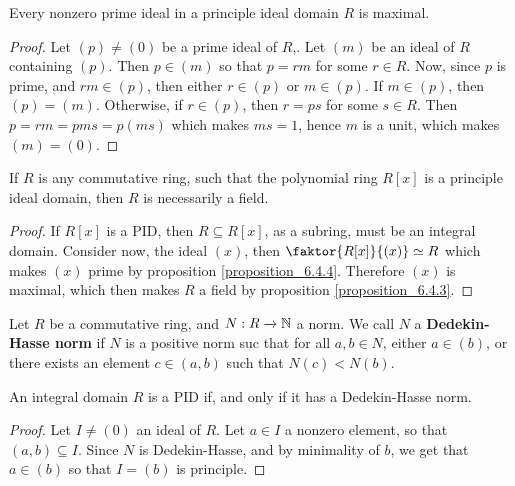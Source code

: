 \begin{proposition}\label{proposition_6.6.2}
  Every nonzero prime ideal in a principle ideal domain $R$ is maximal.
\end{proposition}
\begin{proof}
  Let $(p) \neq (0)$ be a prime ideal of $R$,. Let $(m)$ be an ideal of $R$
  containing $(p)$. Then $p \in (m)$ so that $p=rm$ for some  $r \in R$. Now,
  since $p$ is prime, and $rm \in (p)$, then either $r \in (p)$ or $m \in
  (p)$. If $m \in (p)$, then $(p)=(m)$. Otherwise, if $r \in (p)$, then $r=ps$
  for some  $s \in R$. Then  $p=rm=pms=p(ms)$ which makes $ms=1$, hence $m$ is
  a unit, which makes $(m)=(0)$.
\end{proof}
\begin{corollary}
  If $R$ is any commutative ring, such that the polynomial ring $R[x]$ is a
  principle ideal domain, then $R$ is necessarily a field.
\end{corollary}
\begin{proof}
  If $R[x]$ is a PID, then $R \subseteq R[x]$, as a subring, must be an
  integral domain. Consider now, the ideal $(x)$, then $\faktor{R[x]}{(x)}
  \simeq R$ which makes $(x)$ prime by proposition \ref{proposition_6.4.4}. Therefore $(x)$ is
  maximal, which then makes $R$ a field by proposition \ref{proposition_6.4.3}.
\end{proof}

\begin{definition}
  Let $R$ be a commutative ring, and  $N:R \xrightarrow{} \mathbb{N}$ a norm. We call
  $N$ a \textbf{Dedekin-Hasse norm} if $N$ is a positive norm suc that for
  all $a,b \in N$, either $a \in (b)$, or there exists an element $c \in
  (a,b)$ such that $N(c)<N(b)$.
\end{definition}

\begin{proposition}\label{proposition_6.6.3}
  An integral domain $R$ is a PID if, and only if it has a Dedekin-Hasse norm.
\end{proposition}
\begin{proof}
  Let $I \neq (0)$ an ideal of $R$. Let $a \in I$ a nonzero element, so that
  $(a,b) \subseteq I$. Since $N$ is Dedekin-Hasse, and by minimality of $b$,
  we get that $a \in (b)$ so that $I=(b)$ is principle.
\end{proof}

